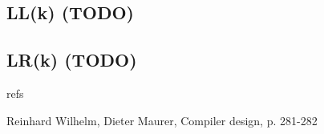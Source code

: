 \documentclass[10pt,a4paper,notitlepage]{article}
\theoremstyle{plain}
\theoremstyle{definition}
\theoremstyle{definition}
\theoremstyle{remark}
\theoremstyle{remark}
\theoremstyle{plain}
\theoremstyle{plain}
\theoremstyle{plain}
\theoremstyle{remark}
\begin{document}
\subsection{LL(k) (TODO)}

\subsection{LR(k) (TODO)}

refs

Reinhard Wilhelm, Dieter Maurer, Compiler design, p. 281-282
\end{document}

